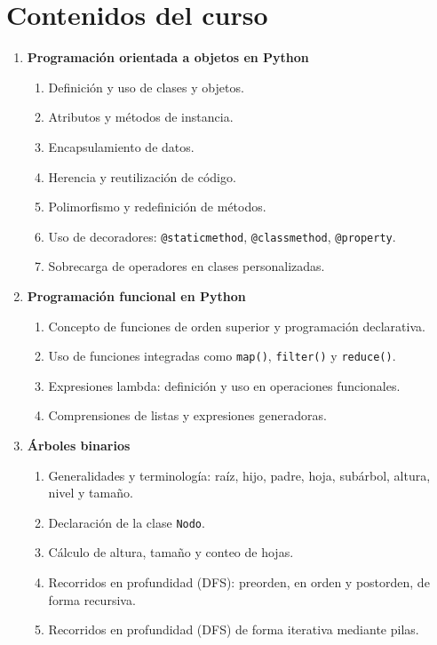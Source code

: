 \section{Contenidos del curso}

\begin{enumerate}

  \item \textbf{Programación orientada a objetos en Python}

  \begin{enumerate}
    \item \label{itm:1.1} Definición y uso de clases y objetos.
    \item \label{itm:1.2} Atributos y métodos de instancia.
    \item \label{itm:1.3} Encapsulamiento de datos.
    \item \label{itm:1.4} Herencia y reutilización de código.
    \item \label{itm:1.5} Polimorfismo y redefinición de métodos.
    \item \label{itm:1.6} Uso de decoradores: \texttt{@staticmethod}, \texttt{@classmethod}, \texttt{@property}.
    \item \label{itm:1.7} Sobrecarga de operadores en clases personalizadas.
  \end{enumerate}

  \item \textbf{Programación funcional en Python}

  \begin{enumerate}
    \item \label{itm:2.1} Concepto de funciones de orden superior y programación declarativa.
    \item \label{itm:2.2} Uso de funciones integradas como \texttt{map()}, \texttt{filter()} y \texttt{reduce()}.
    \item \label{itm:2.3} Expresiones lambda: definición y uso en operaciones funcionales.
    \item \label{itm:2.4} Comprensiones de listas y expresiones generadoras.
  \end{enumerate}

  \item \textbf{Árboles binarios}

  \begin{enumerate}
    \item \label{itm:3.1} Generalidades y terminología: raíz, hijo, padre, hoja, subárbol, altura, nivel y tamaño.
    \item \label{itm:3.2} Declaración de la clase \texttt{Nodo}.
    \item \label{itm:3.3} Cálculo de altura, tamaño y conteo de hojas.
    \item \label{itm:3.4} Recorridos en profundidad (DFS): preorden, en orden y postorden, de forma recursiva.
    \item \label{itm:3.5} Recorridos en profundidad (DFS) de forma iterativa mediante pilas.
  \end{enumerate}


\end{enumerate}
